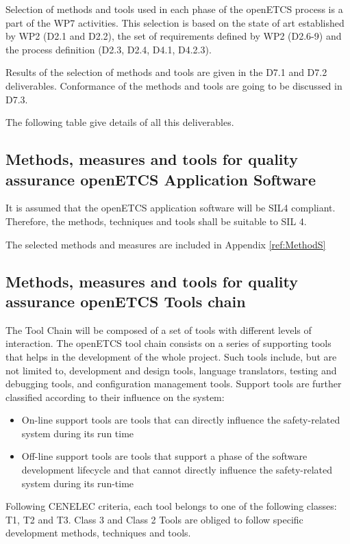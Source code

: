 \documentclass{template/openetcs_article}
\begin{document}
Selection of methods and tools used in each phase of the openETCS process is a part of the WP7 activities. This selection is based on the state of art established by WP2 (D2.1 and D2.2), the set of requirements defined by WP2 (D2.6-9) and the process definition (D2.3, D2.4, D4.1, D4.2.3).

Results of the selection of methods and tools are given in the D7.1 and D7.2 deliverables. Conformance of the methods and tools are going to be discussed in D7.3.

The following table give details of all this deliverables.




\subsection{Methods, measures and tools for quality assurance openETCS Application Software}

It is assumed that the openETCS application software will be \gls{SIL}4 compliant. Therefore, the methods, techniques and tools shall be suitable to \gls{SIL} 4. 

The selected methods and measures are included in Appendix  \ref{ref:MethodS}

\subsection{Methods, measures and tools for quality assurance openETCS Tools chain}

The Tool Chain will be composed of a set of tools with different levels of interaction. The openETCS tool chain consists on a series of supporting tools that helps in the development of the whole project. Such tools include, but are not limited to, development and design tools, language translators, testing and debugging tools, and configuration management tools. Support tools are further classified according to their influence on the system:
\begin{itemize}
\item On-line support tools are tools that can directly influence the safety-related system during its run time
\item Off-line support tools are tools that support a phase of the software development lifecycle and that cannot directly influence the safety-related system during its run-time
\end{itemize}

Following CENELEC criteria, each tool belongs to one of the following classes: T1, T2 and T3. Class 3 and Class 2 Tools are obliged to follow specific development methods, techniques and tools. 
\end{document}
